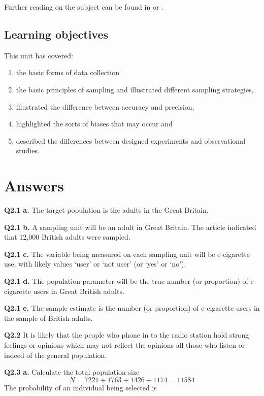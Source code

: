 \documentclass[
  oneside]{krantz}
\begin{document}
Further reading on the subject can be found in \citep{richard2006veaux} or \citep{wildgaf}.

\hypertarget{learning-objectives}{%
\subsection{Learning objectives}\label{learning-objectives}}

This unit has covered:

\begin{enumerate}
\def\labelenumi{\arabic{enumi}.}
\item
  the basic forms of data collection
\item
  the basic principles of sampling and illustrated different sampling strategies,
\item
  illustrated the difference between accuracy and precision,
\item
  highlighted the sorts of biases that may occur and
\item
  described the differences between designed experiments and observational studies.
\end{enumerate}

\hypertarget{ANSsamp}{%
\section{Answers}\label{ANSsamp}}

\textbf{Q2.1} \textbf{a.} The target population is the adults in the Great Britain.

\textbf{Q2.1} \textbf{b.} A sampling unit will be an adult in Great Britain. The article indicated that 12,000 British adults were sampled.

\textbf{Q2.1} \textbf{c.} The variable being measured on each sampling unit will be e-cigarette use, with likely values `user' or `not user' (or `yes' or `no').

\textbf{Q2.1} \textbf{d.} The population parameter will be the true number (or proportion) of e-cigarette users in Great British adults.

\textbf{Q2.1} \textbf{e.} The sample estimate is the number (or proportion) of e-cigarette users in the sample of British adults.

\textbf{Q2.2} It is likely that the people who phone in to the radio station hold strong feelings or opinions which may not reflect the opinions all those who listen or indeed of the general population.

\textbf{Q2.3} \textbf{a.} Calculate the total population size
\[ N = 7221 + 1763 + 1426 + 1174 = 11584\]
The probability of an individual being selected is
\end{document}
